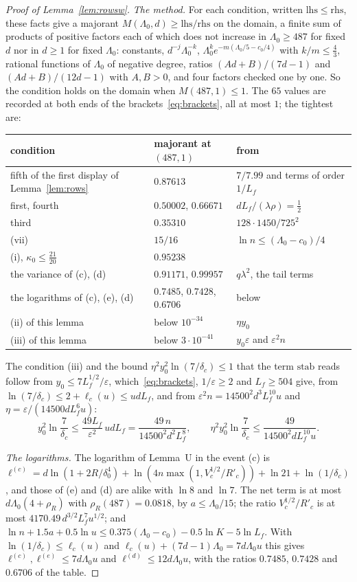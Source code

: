 \documentclass[11pt]{amsart}
\theoremstyle{definition}
\numberwithin{equation}{section}
\begin{document}
\begin{proof}[Proof of Lemma~\ref{lem:rowsw}]
\emph{The method.} For each condition, written $\mathrm{lhs}\le\mathrm{rhs}$, these facts give a majorant $M(\Lambda_0,d)\ge\mathrm{lhs}/\mathrm{rhs}$ on the domain, a finite sum of products of positive factors each of which does not increase in $\Lambda_0\ge487$ for fixed $d$ nor in $d\ge1$ for fixed $\Lambda_0$: constants, $d^{-j}\Lambda_0^{-k}$, $\Lambda_0^ke^{-m(\Lambda_0/5-c_0/4)}$ with $k/m\le\frac43$, rational functions of $\Lambda_0$ of negative degree, ratios $(Ad+B)/(7d-1)$ and $(Ad+B)/(12d-1)$ with $A,B>0$, and four factors checked one by one. So the condition holds on the domain when $M(487,1)\le1$. The $65$ values are recorded at both ends of the brackets~\eqref{eq:brackets}, all at most $1$; the tightest are:
\begin{center}\small
\begin{tabular}{lll}
condition & majorant at $(487,1)$ & from\\\hline
fifth of the first display of Lemma~\ref{lem:rows} & $0.87613$ & $7/7.99$ and terms of order $1/L_f$\\
first, fourth & $0.50002$, $0.66671$ & $dL_f/(\lambda\rho)=\frac12$\\
third & $0.35310$ & $128\cdot1450/725^2$\\
(vii) & $15/16$ & $\ln n\le(\Lambda_0-c_0)/4$\\
(i), $\kappa_0\le\frac{21}{20}$ & $0.95238$ & \\
the variance of (c), (d) & $0.91171$, $0.99957$ & $q\lambda^2$, the tail terms\\
the logarithms of (c), (e), (d) & $0.7485$, $0.7428$, $0.6706$ & below\\
(ii) of this lemma & below $10^{-34}$ & $\eta y_0$\\
(iii) of this lemma & below $3\cdot10^{-41}$ & $y_0\varepsilon$ and $\varepsilon^2n$
\end{tabular}
\end{center}
The condition (iii) and the bound $\eta^2y_0^2\ln(7/\delta_c)\le1$ that the term $\mathrm{stab}$ reads follow from $y_0\le7L_f^{1/2}/\varepsilon$, which~\eqref{eq:brackets}, $1/\varepsilon\ge2$ and $L_f\ge504$ give, from $\ln(7/\delta_c)\le2+\ell_c(u)\le udL_f$, and from $\varepsilon^2n=14500^2d^3L_f^{10}u$ and $\eta=\varepsilon/(14500dL_f^6u)$:
\[
y_0^2\ln\frac7{\delta_c}\le\frac{49L_f}{\varepsilon^2}\,udL_f=\frac{49\,n}{14500^2d^2L_f^8},\qquad\eta^2y_0^2\ln\frac7{\delta_c}\le\frac{49}{14500^2dL_f^{10}u}.
\]

\emph{The logarithms.} The logarithm of Lemma~U in the event (c) is $\ell^{(c)}=d\ln(1+2R/\delta_0^4)+\ln(4n\max(1,V_c^{1/2}/R'_c))+\ln21+\ln(1/\delta_c)$, and those of (e) and (d) are alike with $\ln8$ and $\ln7$. The net term is at most $d\Lambda_0(4+\rho_R)$ with $\rho_R(487)=0.0818$, by $a\le\Lambda_0/15$; the ratio $V_c^{1/2}/R'_c$ is at most $4170.49\,d^{3/2}L_f^7u^{1/2}$; and $\ln n+1.5a+0.5\ln u\le0.375(\Lambda_0-c_0)-0.5\ln K-5\ln L_f$. With $\ln(1/\delta_c)\le\ell_c(u)$ and $\ell_c(u)+(7d-1)\Lambda_0=7d\Lambda_0u$ this gives $\ell^{(c)},\ell^{(e)}\le7d\Lambda_0u$ and $\ell^{(d)}\le12d\Lambda_0u$, with the ratios $0.7485$, $0.7428$ and $0.6706$ of the table.


\end{proof}
\end{document}
